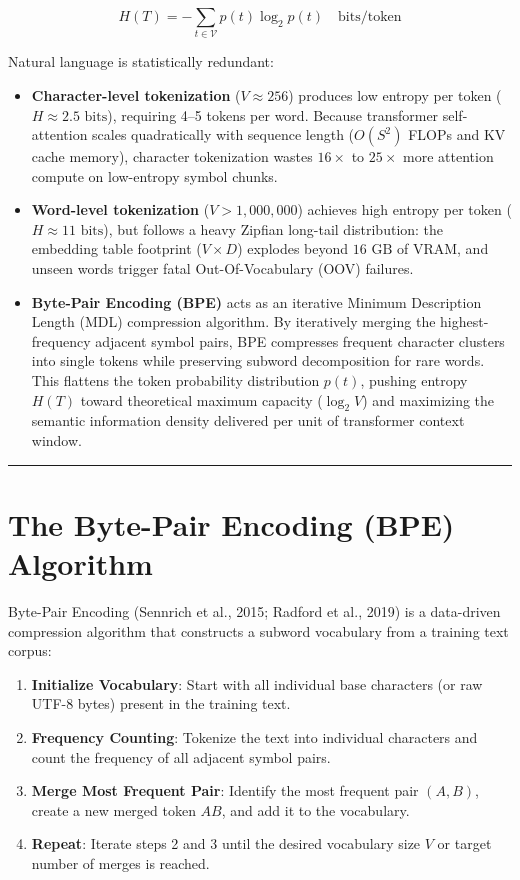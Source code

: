 \documentclass[
  letterpaper,
]{scrbook}
\providecommand{\tightlist}{%
  \setlength{\itemsep}{0pt}\setlength{\parskip}{0pt}}
\begin{document}
\[H(T) = -\sum_{t \in \mathcal{V}} p(t) \log_2 p(t) \quad \text{bits/token}\]

Natural language is statistically redundant:

\begin{itemize}
\tightlist
\item
  \textbf{Character-level tokenization} (\(V \approx 256\)) produces low
  entropy per token (\(H \approx 2.5\text{ bits}\)), requiring 4--5
  tokens per word. Because transformer self-attention scales
  quadratically with sequence length (\(O(S^2)\) FLOPs and KV cache
  memory), character tokenization wastes \(16\times\) to \(25\times\)
  more attention compute on low-entropy symbol chunks.
\item
  \textbf{Word-level tokenization} (\(V > 1,000,000\)) achieves high
  entropy per token (\(H \approx 11\text{ bits}\)), but follows a heavy
  Zipfian long-tail distribution: the embedding table footprint
  (\(V \times D\)) explodes beyond \(16\text{ GB}\) of VRAM, and unseen
  words trigger fatal Out-Of-Vocabulary (OOV) failures.
\item
  \textbf{Byte-Pair Encoding (BPE)} acts as an iterative Minimum
  Description Length (MDL) compression algorithm. By iteratively merging
  the highest-frequency adjacent symbol pairs, BPE compresses frequent
  character clusters into single tokens while preserving subword
  decomposition for rare words. This flattens the token probability
  distribution \(p(t)\), pushing entropy \(H(T)\) toward theoretical
  maximum capacity (\(\log_2 V\)) and maximizing the semantic
  information density delivered per unit of transformer context window.
\end{itemize}

\begin{center}\rule{0.5\linewidth}{0.5pt}\end{center}

\section{The Byte-Pair Encoding (BPE)
Algorithm}\label{the-byte-pair-encoding-bpe-algorithm}

Byte-Pair Encoding (Sennrich et al., 2015; Radford et al., 2019) is a
data-driven compression algorithm that constructs a subword vocabulary
from a training text corpus:

\begin{enumerate}
\def\labelenumi{\arabic{enumi}.}
\tightlist
\item
  \textbf{Initialize Vocabulary}: Start with all individual base
  characters (or raw UTF-8 bytes) present in the training text.
\item
  \textbf{Frequency Counting}: Tokenize the text into individual
  characters and count the frequency of all adjacent symbol pairs.
\item
  \textbf{Merge Most Frequent Pair}: Identify the most frequent pair
  \((A, B)\), create a new merged token \(AB\), and add it to the
  vocabulary.
\item
  \textbf{Repeat}: Iterate steps 2 and 3 until the desired vocabulary
  size \(V\) or target number of merges is reached.
\end{enumerate}
\end{document}
